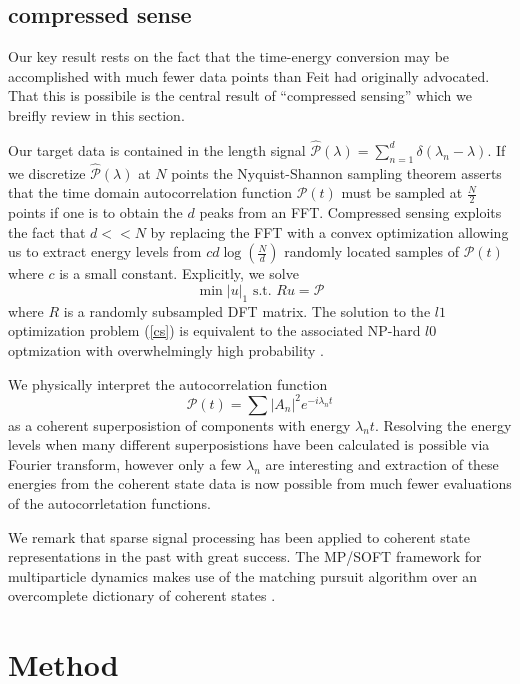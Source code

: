 \documentclass[10pt]{amsart}
\theoremstyle{remark}
\begin{document}
\subsection{compressed sense}
Our key result rests on the fact that the time-energy conversion may be accomplished with much fewer data points than Feit had originally advocated. That this is possibile is the central result of ``compressed sensing'' \cite{Candes.2006} which we breifly review in this section.

Our target data is contained in the length signal $\hat{\mathcal{P}}(\lambda) = \sum_{n=1}^d \delta(\lambda_n - \lambda)$. If we discretize $\hat{\mathcal{P}}(\lambda)$ at $N$ points the Nyquist-Shannon sampling theorem asserts that the time domain autocorrelation function $\mathcal{P}(t)$ must be sampled at $\frac{N}{2}$ points if one is to obtain the $d$ peaks from an FFT. Compressed sensing exploits the fact that $d << N$ by replacing the FFT with a convex optimization allowing us to extract energy levels from $cd\log(\frac{N}{d})$ randomly located samples of $\mathcal{P}(t)$ where $c$ is a small constant. Explicitly, we solve
\begin{equation}\label{cs}
\min |u|_1 \text{ s.t. } Ru = \mathcal{P}
\end{equation}
where $R$ is a randomly subsampled DFT matrix. The solution to the $l1$ optimization problem (\ref{cs}) is equivalent to the associated NP-hard $l0$ optmization with overwhelmingly high probability \cite{Candes2006}.

We physically interpret the autocorrelation function
\begin{equation}
\mathcal{P}(t) = \sum |A_n|^2 e^{-i\lambda_nt}
\end{equation}
as a coherent superposistion of components with energy $\lambda_nt$. Resolving the energy levels when many different superposistions have been calculated is possible via Fourier transform, however only a few $\lambda_n$ are interesting and extraction of these energies from the coherent state data is now possible from much fewer evaluations of the autocorrletation functions. 

We remark that sparse signal processing has been applied to coherent state representations in the past with great success. The MP/SOFT framework for multiparticle dynamics makes use of the matching pursuit algorithm over an overcomplete dictionary of coherent states \cite{Wu2003} \cite{Wu2004}.


\section{Method}
\end{document}
